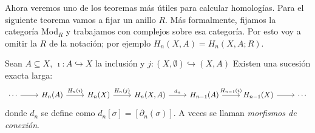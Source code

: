 \documentclass[../../topologia_algebraica]{subfiles}
\begin{document}
Ahora veremos uno de los teoremas m\'as \'utiles para calcular homolog\'ias. Para el siguiente
teorema vamos
a fijar un anillo $R$. M\'as formalmente, fijamos la categor\'ia  Mod$_R$ y trabajamos con complejos sobre
esa categor\'ia. Por esto voy a omitir la $R$ de la notaci\'on; por ejemplo $H_n(X,A)=H_n(X,A;R)$.

\begin{thm}\label{thm:sucesion_exacta_larga}
  Sean $A\subseteq X$,  $\imath:A\hookrightarrow X$ la inclusi\'on y
  $j:(X,\emptyset)\hookrightarrow(X,A)$ Existen una sucesi\'on exacta larga:
  \begin{equation}\label{eq:sucesion_exacta_larga}
    \begin{tikzcd}
      \cdots \arrow[r] & H_n(A) \arrow[r,"H_n(\imath)"] & H_n(X) \arrow[r,"H_n(j)"] &
      H_n(X,A) \arrow[r,"d_n"] & H_{n-1}(A) \arrow[r,"H_{n-1}(\imath)"] & H_{n-1}(X) \arrow[r] & \cdots  
    \end{tikzcd}
  \end{equation}
  donde $d_n$ se define como $d_n[\sigma]=[\partial_n(\sigma)]$. A veces se llaman
  \emph{morfismos de conexi\'on}.
\end{thm}
\end{document}
